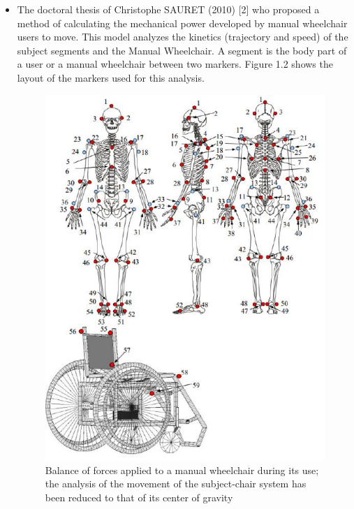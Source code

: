 \begin{itemize}
\item The doctoral thesis of Christophe SAURET (2010) [2] who proposed a method of calculating the mechanical power developed by manual wheelchair users to move. This model analyzes the kinetics (trajectory and speed) of the subject segments and the Manual Wheelchair. A segment is the body part of a user or a manual wheelchair between two markers. Figure 1.2 shows the layout of the markers used for this analysis.

\begin{figure}[h]
\center
\includegraphics[scale = 0.7]{images/squelette}
\caption{Balance of forces applied to a manual wheelchair during its use; the analysis of the movement of the subject-chair system has been reduced to that of its center of gravity }
\label{Wheelchair_model}
\end{figure}

\end{itemize}



